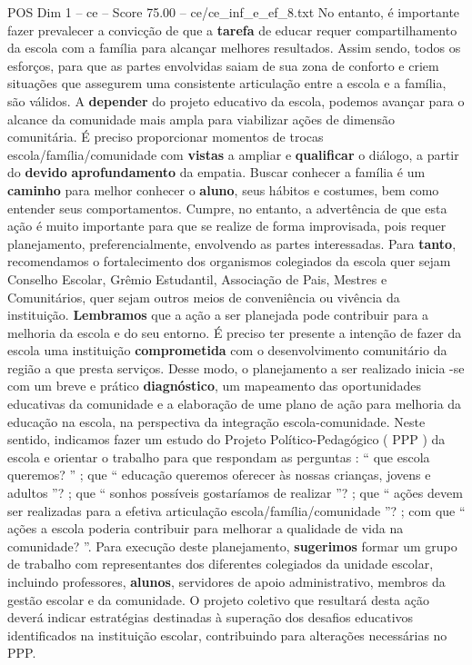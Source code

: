 \begin{textsample}{POS Dim 1 – ce – Score 75.00 – ce/ce\_inf\_e\_ef\_8.txt}
No entanto, é importante fazer prevalecer a convicção de que a \textbf{tarefa} de educar requer compartilhamento da escola com a família para alcançar melhores resultados.
Assim sendo, todos os esforços, para que as partes envolvidas saiam de sua zona de conforto e criem situações que assegurem uma consistente articulação entre a escola e a família, são válidos.
A \textbf{depender} do projeto educativo da escola, podemos avançar para o alcance da comunidade mais ampla para viabilizar ações de dimensão comunitária.
É preciso proporcionar momentos de trocas escola/família/comunidade com \textbf{vistas} a ampliar e \textbf{qualificar} o diálogo, a partir do \textbf{devido} \textbf{aprofundamento} da empatia.
Buscar conhecer a família é um \textbf{caminho} para melhor conhecer o \textbf{aluno}, seus hábitos e costumes, bem como entender seus comportamentos.
Cumpre, no entanto, a advertência de que esta ação é muito importante para que se realize de forma improvisada, pois requer planejamento, preferencialmente, envolvendo as partes interessadas.
Para \textbf{tanto}, recomendamos o fortalecimento dos organismos colegiados da escola quer sejam Conselho Escolar, Grêmio Estudantil, Associação de Pais, Mestres e Comunitários, quer sejam outros meios de conveniência ou vivência da instituição. \textbf{Lembramos} que a ação a ser planejada pode contribuir para a melhoria da escola e do seu entorno.
É preciso ter presente a intenção de fazer da escola uma instituição \textbf{comprometida} com o desenvolvimento comunitário da região a que presta serviços.
Desse modo, o planejamento a ser realizado inicia -se com um breve e prático \textbf{diagnóstico}, um mapeamento das oportunidades educativas da comunidade e a elaboração de ume plano de ação para melhoria da educação na escola, na perspectiva da integração escola-comunidade.
Neste sentido, indicamos fazer um estudo do Projeto Político-Pedagógico ( PPP ) da escola e orientar o trabalho para que respondam as perguntas : “ que escola queremos? ” ; que “ educação queremos oferecer às nossas crianças, jovens e adultos ”? ; que “ sonhos possíveis gostaríamos de realizar ”? ; que “ ações devem ser realizadas para a efetiva articulação escola/família/comunidade ”? ; com que “ ações a escola poderia contribuir para melhorar a qualidade de vida na comunidade? ”.
Para execução deste planejamento, \textbf{sugerimos} formar um grupo de trabalho com representantes dos diferentes colegiados da unidade escolar, incluindo professores, \textbf{alunos}, servidores de apoio administrativo, membros da gestão escolar e da comunidade.
O projeto coletivo que resultará desta ação deverá indicar estratégias destinadas à superação dos desafios educativos identificados na instituição escolar, contribuindo para alterações necessárias no PPP.

\end{textsample}
